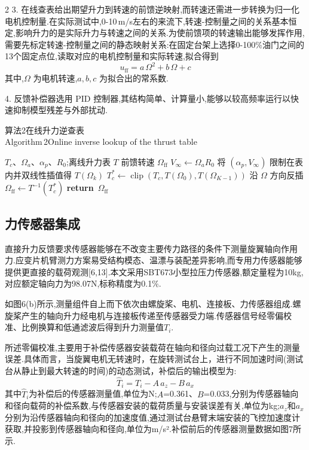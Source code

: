 \documentclass{aas}
\begin{document}
\begin{multicols}{2}
3. 在线查表给出期望升力到转速的前馈逆映射,而转速还需进一步转换为归一化电机控制量.在实际测试中,0-10\,m/s左右的来流下,转速-控制量之间的关系基本恒定,影响升力的是实际升力与转速之间的关系.为使前馈项的转速输出能够发挥作用,需要先标定转速-控制量之间的静态映射关系:在固定台架上选择0-100\%油门之间的13个固定点位,读取对应的电机控制量和实际转速,拟合得到
\begin{equation}
u_{\mathrm{ff}}=a\,\Omega^2+b\,\Omega+c
\label{eq:rpm_calib}
\end{equation}
其中,$\Omega$ 为电机转速,$a,b,c$ 为拟合出的常系数.

4. 反馈补偿器选用 PID 控制器,其结构简单、计算量小,能够以较高频率运行以快速抑制模型残差与外部扰动.
\begin{center}
\begin{minipage}{0.98\columnwidth}
\centering
{\small 算法2\quad 在线升力逆查表
\\
Algorithm\,2\quad Online inverse lookup of the thrust table}
\vskip2mm
\footnotesize
\begin{algorithmic}[1]
\Require $T_c$、$\Omega_a$、$\alpha_p$、$R_0$;离线升力表 $T$
\Ensure 前馈转速 $\Omega_{\mathrm{ff}}$
\State $V_\infty\gets\Omega_aR_0$
\State 将 $(\alpha_p,V_\infty)$ 限制在表内并双线性插值得 $T(\Omega_k)$
\State $T_c^*\gets\operatorname{clip}\!\left(T_c,T(\Omega_0),T(\Omega_{K-1})\right)$
\State 沿 $\Omega$ 方向反插 $\Omega_{\mathrm{ff}}\gets T^{-1}(T_c^*)$
\State \textbf{return}\ $\Omega_{\mathrm{ff}}$
\end{algorithmic}
\end{minipage}
\end{center}

\subsection{力传感器集成}
直接升力反馈要求传感器能够在不改变主要传力路径的条件下测量旋翼轴向作用力.应变片机臂测力方案易受结构模态、温漂与装配差异影响,而专用力传感器能够提供更直接的载荷观测[6,13].本文采用SBT673小型拉压力传感器,额定量程为10kg,对应额定轴向力为98.07N,标称精度为0.1$\%$.

如图6(b)所示,测量组件自上而下依次由螺旋桨、电机、连接板、力传感器组成.螺旋桨产生的轴向升力经电机与连接板传递至传感器受力端.传感器信号经零偏校准、比例换算和低通滤波后得到升力测量值$T_i$.

所述零偏校准,主要用于补偿传感器安装载荷在轴向和径向过载工况下产生的测量误差.具体而言，当旋翼电机无转速时，在旋转测试台上，进行不同加速时间(测试台从静止到最大转速的时间)的动态测试，补偿后的输出模型为:
\begin{equation}
\hat{T}_i=T_i-A\,a_z-B\,a_x
\label{eq:sensor_calib}
\end{equation}
其中$\hat{T}_i$为补偿后的传感器测量值,单位为N;$A$=0.361、$B$=0.033,分别为传感器轴向和径向载荷的补偿系数,与传感器安装的载荷质量与安装误差有关,单位为kg;$a_z$和$a_x$分别为沿传感器轴向和径向的加速度值,通过测试台悬臂末端安装的飞控加速度计获取,并投影到传感器轴向和径向,单位为m/s².补偿前后的传感器测量数据如图7所示.


\end{multicols}
\end{document}

